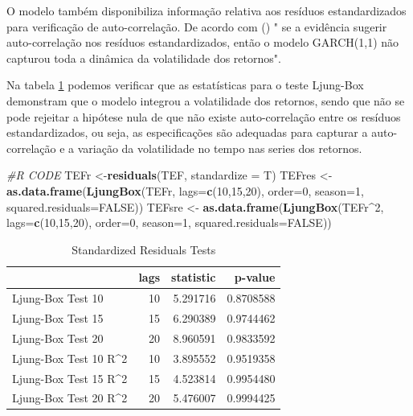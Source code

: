 \documentclass[
  12pt,
  a4paper,
  openany]{book}
\newenvironment{Shaded}{\begin{snugshade}}{\end{snugshade}}
\newcommand{\CommentTok}[1]{\textcolor[rgb]{0.56,0.35,0.01}{\textit{#1}}}
\newcommand{\DataTypeTok}[1]{\textcolor[rgb]{0.13,0.29,0.53}{#1}}
\newcommand{\DecValTok}[1]{\textcolor[rgb]{0.00,0.00,0.81}{#1}}
\newcommand{\KeywordTok}[1]{\textcolor[rgb]{0.13,0.29,0.53}{\textbf{#1}}}
\newcommand{\NormalTok}[1]{#1}
\newcommand{\OperatorTok}[1]{\textcolor[rgb]{0.81,0.36,0.00}{\textbf{#1}}}
\newcommand{\OtherTok}[1]{\textcolor[rgb]{0.56,0.35,0.01}{#1}}
\newcommand{\StringTok}[1]{\textcolor[rgb]{0.31,0.60,0.02}{#1}}
\begin{document}
O modelo também disponibiliza informação relativa aos resíduos estandardizados para verificação de auto-correlação. De acordo com (\citet{rvol}) " se a evidência sugerir auto-correlação nos resíduos estandardizados, então o modelo GARCH(1,1) não capturou toda a dinâmica da volatilidade dos retornos".

Na tabela \ref{tab:TEFLjunk} podemos verificar que as estatísticas para o teste Ljung-Box demonstram que o modelo integrou a volatilidade dos retornos, sendo que não se pode rejeitar a hipótese nula de que não existe auto-correlação entre os resíduos estandardizados, ou seja, as especificações são adequadas para capturar a auto-correlação e a variação da volatilidade no tempo nas series dos retornos.

\scriptsize

\begin{Shaded}
\begin{Highlighting}[]
\CommentTok{\#R CODE}
\NormalTok{TEFr \textless{}{-}}\KeywordTok{residuals}\NormalTok{(TEF, }\DataTypeTok{standardize =}\NormalTok{ T)}
\NormalTok{TEFres \textless{}{-}}\StringTok{ }\KeywordTok{as.data.frame}\NormalTok{(}\KeywordTok{LjungBox}\NormalTok{(TEFr, }\DataTypeTok{lags=}\KeywordTok{c}\NormalTok{(}\DecValTok{10}\NormalTok{,}\DecValTok{15}\NormalTok{,}\DecValTok{20}\NormalTok{), }\DataTypeTok{order=}\DecValTok{0}\NormalTok{, }\DataTypeTok{season=}\DecValTok{1}\NormalTok{, }\DataTypeTok{squared.residuals=}\OtherTok{FALSE}\NormalTok{))}
\NormalTok{TEFsre \textless{}{-}}\StringTok{ }\KeywordTok{as.data.frame}\NormalTok{(}\KeywordTok{LjungBox}\NormalTok{(TEFr}\OperatorTok{\^{}}\DecValTok{2}\NormalTok{, }\DataTypeTok{lags=}\KeywordTok{c}\NormalTok{(}\DecValTok{10}\NormalTok{,}\DecValTok{15}\NormalTok{,}\DecValTok{20}\NormalTok{), }\DataTypeTok{order=}\DecValTok{0}\NormalTok{, }\DataTypeTok{season=}\DecValTok{1}\NormalTok{, }\DataTypeTok{squared.residuals=}\OtherTok{FALSE}\NormalTok{))}
\end{Highlighting}
\end{Shaded}

\normalsize

\begin{table}[!h]

\caption{\label{tab:TEFLjunk}Standardized Residuals Tests}
\centering
\begin{tabular}[t]{lrrr}
\toprule
  & lags & statistic & p-value\\
\midrule
Ljung-Box Test 10 & 10 & 5.291716 & 0.8708588\\
Ljung-Box Test 15 & 15 & 6.290389 & 0.9744462\\
Ljung-Box Test 20 & 20 & 8.960591 & 0.9833592\\
Ljung-Box Test 10 R\textasciicircum{}2 & 10 & 3.895552 & 0.9519358\\
Ljung-Box Test 15 R\textasciicircum{}2 & 15 & 4.523814 & 0.9954480\\
\addlinespace
Ljung-Box Test 20 R\textasciicircum{}2 & 20 & 5.476007 & 0.9994425\\
\bottomrule
\end{tabular}
\end{table}
\FloatBarrier
\centering
\end{document}
